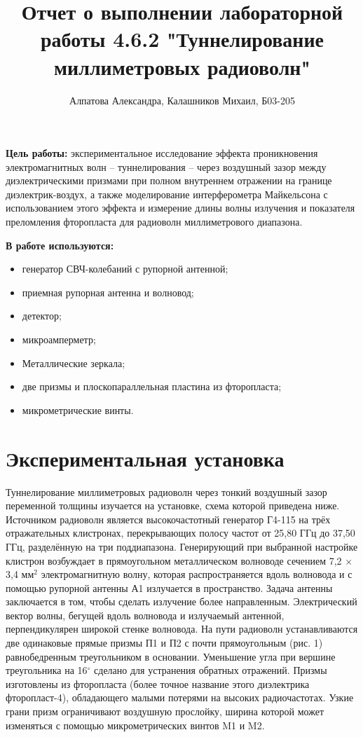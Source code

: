\documentclass[14pt, a4paper]{report}
\title{\textbf{Отчет о выполнении лабораторной работы 4.6.2 "Туннелирование миллиметровых радиоволн"}}
\author{Алпатова Александра, Калашников Михаил, Б03-205}
\date{}
\begin{document}
\maketitle

\textbf{Цель работы:}
экспериментальное исследование эффекта проникновения электромагнитных волн -- туннелирования -- через воздушный зазор между диэлектрическими призмами при полном внутреннем отражении на границе диэлектрик-воздух, а также моделирование интерферометра Майкельсона с использованием этого эффекта и измерение длины волны излучения и показателя преломления фторопласта для радиоволн миллиметрового диапазона.
\newline

\textbf{В работе используются:}
\begin{itemize}
\item генератор СВЧ-колебаний с рупорной антенной;
\item приемная рупорная антенна и волновод;
\item детектор;
\item микроамперметр;
\item Металлические зеркала;
\item две призмы и плоскопараллельная пластина из фторопласта;
\item микрометрические винты.
\end{itemize}

\section{Экспериментальная установка}

Туннелирование миллиметровых
радиоволн через тонкий воздушный зазор переменной толщины изучается на установке, схема которой приведена ниже. Источником радиоволн является высокочастотный генератор Г4-115 на трёх отражательных клистронах, перекрывающих полосу частот от 25,80 ГГц до 37,50 ГГц, разделённую на три поддиапазона. Генерирующий при выбранной настройке клистрон возбуждает в прямоугольном металлическом волноводе сечением 7,2 × 3,4 мм$^2$ электромагнитную волну, которая распространяется вдоль волновода и с помощью рупорной антенны А1 излучается в пространство. Задача антенны заключается в том, чтобы сделать излучение более направленным. Электрический вектор волны, бегущей вдоль волновода и излучаемый антенной, перпендикулярен широкой стенке волновода.
На пути радиоволн устанавливаются две одинаковые прямые призмы П1 и П2 с почти прямоугольным (рис. 1) равнобедренным треугольником в основании. Уменьшение угла при вершине треугольника на 16$^\circ$ сделано для устранения обратных отражений. Призмы изготовлены из фторопласта (более точное название этого диэлектрика фторопласт-4), обладающего малыми потерями на высоких радиочастотах. Узкие грани призм ограничивают воздушную прослойку, ширина которой может изменяться с помощью микрометрических винтов M1 и M2.
\end{document}
